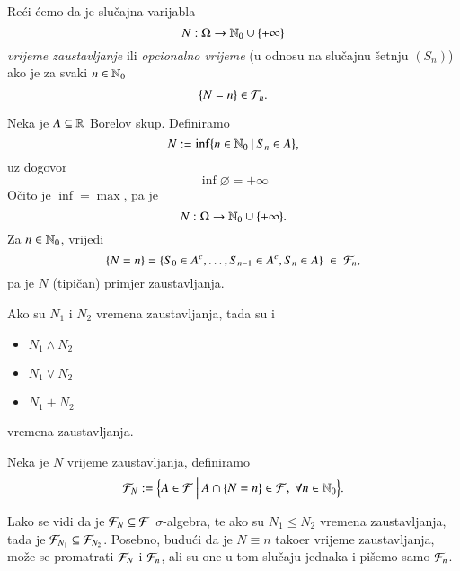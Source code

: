 \begin{defn}    \label{defn:15.2-1}
    Re\' ci \' cemo da je slu\v cajna varijabla
    \begin{equation*}
        N : \Omega \to  \mathbb{N}_0 \cup \{ +\infty \}
    \end{equation*}
    \emph{vrijeme zaustavljanje} ili \emph{opcionalno vrijeme} (u odnosu na slu\v cajnu \v setnju $(S_n)$) ako je za svaki $n \in \mathbb{N}_0$
    \begin{equation*}
        \{ N = n \} \in \mathcal{F}_n.
    \end{equation*}
\end{defn}

\begin{pr}  \label{pr:15.3}
    Neka je $A \subseteq \mathbb{R}$ Borelov skup.
    Definiramo
    \begin{equation*}
        N := \inf \{{n \in \mathbb{N}_0} \: | \: {S_n \in A}\},
    \end{equation*}
    uz dogovor
    \begin{equation*}
        \inf \varnothing = +\infty
    \end{equation*}
    O\v cito je $\inf = \max$, pa je
    \begin{equation*}
        N: \Omega \to \mathbb{N}_0 \cup \{+\infty\}.
    \end{equation*}
    Za $n \in \mathbb{N}_0$, vrijedi
    \begin{equation*}
        \{ N = n \} = \{ S_0 \in A^c, \ldots, S_{n - 1} \in A^c, S_n \in A \} \; \in \; \mathcal{F}_n,
    \end{equation*}
    pa je $N$ (tipi\v can) primjer zaustavljanja.
\end{pr}

\begin{zad} \label{zad:15.4}
    Ako su $N_1$ i $N_2$ vremena zaustavljanja, tada su i
    \begin{itemize}
        \item[] $N_1 \land N_2$
        \item[] $N_1 \lor N_2$
        \item[] $N_1 + N_2$  
    \end{itemize}
    vremena zaustavljanja.
\end{zad}

\begin{defn}    \label{defn:15.4-1}
    Neka je $N$ vrijeme zaustavljanja, definiramo
    \begin{equation}    \label{jed:15.5}
        \mathcal{F}_N := \Big\{{A \in \mathcal{F}} \: \Big| \: {A \cap \{N = n\} \in \mathcal{F}, \; \forall n \in \mathbb{N}_0 }\Big\}.
    \end{equation}
\end{defn}

Lako se vidi da je $\mathcal{F}_N \subseteq \mathcal{F}$ $\sigma$-algebra, te ako su $N_1 \leq N_2$ vremena zaustavljanja, tada je $\mathcal{F}_{N_1} \subseteq \mathcal{F}_{N_2}$.
Posebno, budu\' ci da je $N \equiv n$ tako\dj er vrijeme zaustavljanja, mo\v ze se promatrati $\mathcal{F}_N$ i $\mathcal{F}_n$, ali su one u tom slu\v caju jednaka i pi\v semo samo $\mathcal{F}_n$.